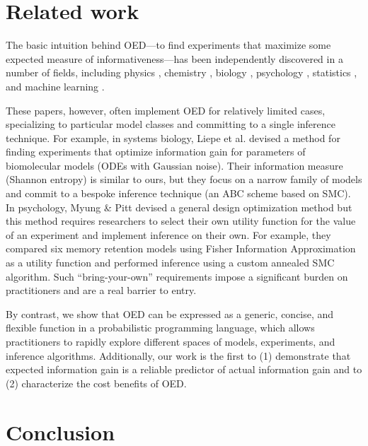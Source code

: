 \documentclass{article}
\begin{document}

\section{Related work}

The basic intuition behind OED---to find experiments that maximize some expected measure of informativeness---has been independently discovered in a number of fields, including physics \cite{vanDenBerg2003}, chemistry \cite{Huan2010}, biology \cite{Vanlier2012, Liepe2013}, psychology \cite{Myung2009}, statistics \cite{Lindley1956}, and machine learning \cite{Golovin2010}.

These papers, however, often implement OED for relatively limited cases, specializing to particular model classes and committing to a single inference technique.
For example, in systems biology, Liepe et al. \cite{Liepe2013} devised a method for finding experiments that optimize information gain for parameters of biomolecular models (ODEs with Gaussian noise).
Their information measure (Shannon entropy) is similar to ours, but they focus on a narrow family of models and commit to a bespoke inference technique (an ABC scheme based on SMC).
In psychology, Myung \& Pitt \cite{Myung2009} devised a general design optimization method but this method requires researchers to select their own utility function for the value of an experiment and implement inference on their own.
For example, they compared six memory retention models using Fisher Information Approximation as a utility function and performed inference using a custom annealed SMC algorithm.
Such ``bring-your-own'' requirements impose a significant burden on practitioners and are a real barrier to entry.

By contrast, we show that OED can be expressed as a generic, concise, and flexible function in a probabilistic programming language, which allows practitioners to rapidly explore different spaces of models, experiments, and inference algorithms.
Additionally, our work is the first to (1) demonstrate that expected information gain is a reliable predictor of actual information gain and to (2) characterize the cost benefits of OED.

\section{Conclusion}
\end{document}
